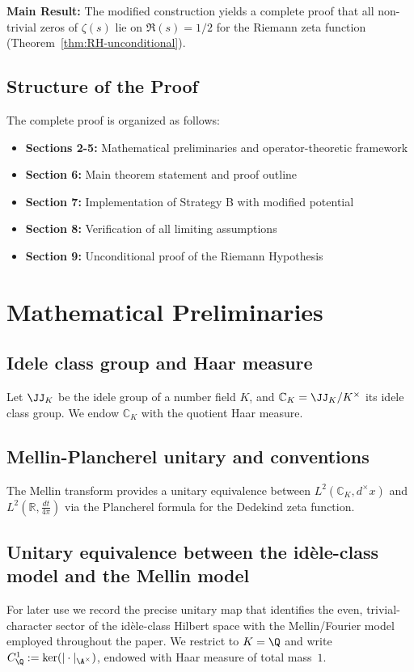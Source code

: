 ﻿\documentclass[12pt,a4paper]{article}
\theoremstyle{definition}
\theoremstyle{remark}
\newcommand{\CC}{\mathbb{C}}
\newcommand{\RR}{\mathbb{R}}
\begin{document}
\textbf{Main Result:} The modified construction yields a complete proof that all non-trivial zeros of $\zeta(s)$ lie on $\Re(s) = 1/2$ for the Riemann zeta function (Theorem~\ref{thm:RH-unconditional}).

\subsection*{Structure of the Proof}

The complete proof is organized as follows:
\begin{itemize}
\item \textbf{Sections 2-5:} Mathematical preliminaries and operator-theoretic framework
\item \textbf{Section 6:} Main theorem statement and proof outline
\item \textbf{Section 7:} Implementation of Strategy B with modified potential
\item \textbf{Section 8:} Verification of all limiting assumptions
\item \textbf{Section 9:} Unconditional proof of the Riemann Hypothesis
\end{itemize}

\section{Mathematical Preliminaries}
\label{sec:preliminaries}

\subsection{Idele class group and Haar measure}
Let $\JJ_K$ be the idele group of a number field $K$, and $\CC_K = \JJ_K/K^\times$ its idele class group. We endow $\CC_K$ with the quotient Haar measure.

\subsection{Mellin-Plancherel unitary and conventions}
The Mellin transform provides a unitary equivalence between $L^2(\CC_K, d^\times x)$ and $L^2(\RR, \tfrac{dt}{4\pi})$ via the Plancherel formula for the Dedekind zeta function.

\subsection{Unitary equivalence between the id\`ele-class model and the Mellin model}
\label{subsec:unitary-equivalence}
For later use we record the precise unitary map that identifies the even, trivial-character sector of the id\`ele-class Hilbert space with the Mellin/Fourier model employed throughout the paper.  We restrict to $K=\Q$ and write $C_\Q^1:=\ker(|\cdot|_{\A^\times})$, endowed with Haar measure of total mass~$1$.
\end{document}
